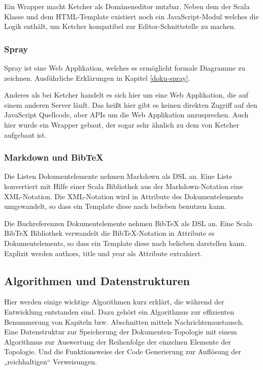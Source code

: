  
Ein Wrapper macht Ketcher als Domäneneditor nutzbar. Neben dem der Scala Klasse und dem HTML-Template existiert noch ein JavaScript-Modul welches die Logik enthält, um Ketcher kompatibel zur Editor-Schnittstelle zu machen.

 
\subsubsection{Spray}\label{}

 
Spray ist eine Web Applikation, welches es ermöglicht formale Diagramme zu zeichnen. Ausführliche Erklärungen in Kapitel \ref{doku-spray}.

 
Anderes als bei Ketcher handelt es sich hier um eine Web Applikation, die auf einem anderen Server läuft. Das heißt hier gibt es keinen direkten Zugriff auf den JavaScript Quellcode, aber APIs um die Web Applikation anzusprechen. Auch hier wurde ein Wrapper gebaut, der sogar sehr ähnlich zu dem von Ketcher aufgebaut ist.

 
\subsubsection{Markdown und BibTeX}\label{}

 
Die Listen Dokumentelemente nehmen Markdown als DSL an. Eine Liste konvertiert mit Hilfe einer Scala Bibliothek aus der Markdown-Notation eine XML-Notation. Die XML-Notation wird in Attribute des Dokumentelements umgewandelt, so dass ein Template diese nach belieben benutzen kann.

 
Die Buchreferenzen Dokumentelemente nehmen BibTeX als DSL an. Eine Scala BibTeX Bibliothek verwandelt die BibTeX-Notation in Attribute es Dokumentelements, so dass ein Template diese nach belieben darstellen kann. Explizit werden authors, title und year als Attribute extrahiert.

 
\subsection{Algorithmen und Datenstrukturen}\label{}
 
Hier werden einige wichtige Algorithmen kurz erklärt, die während der Entwicklung entstanden sind. Dazu gehört ein Algorithmus zur effizienten Benummerung von Kapiteln bzw. Abschnitten mittels Nachrichtenaustausch. Eine Datenstruktur zur Speicherung der Dokumenten-Topologie mit einem Algorithmus zur Auswertung der Reihenfolge der einzelnen Elemente der Topologie. Und die Funktionsweise der Code Generierung zur Auflösung der „reichhaltigen“ Verweisungen.

